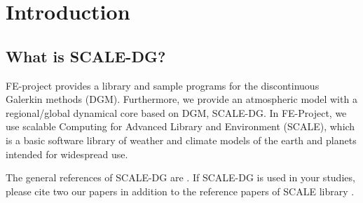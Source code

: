 \chapter{Introduction}

\section{What is SCALE-DG?}
FE-project provides a library and sample programs for the discontinuous Galerkin methods (DGM). 
Furthermore, we provide an atmospheric model with a regional/global dynamical core based on DGM, SCALE-DG.
In FE-Project, we use scalable Computing for Advanced Library and Environment (SCALE),
which is a basic software library of weather and climate models of the earth and planets intended for widespread use.


The general references of SCALE-DG are \cite{KT2023NumAccuracyDG,KT2025SCALEDG}. 
If SCALE-DG is used in your studies, 
please cite two our papers in addition to the reference papers of SCALE library \citep{nishizawa2015influence,sato2015impacts}. 